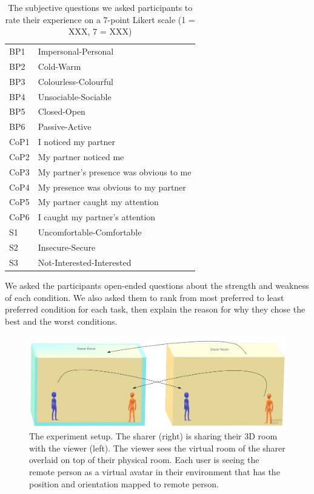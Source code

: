 \begin{table}
    \centering
    \begin{tabular}{ll}
BP1 &    Impersonal-Personal\\
BP2 &    Cold-Warm\\
BP3 &    Colourless-Colourful\\
BP4 &    Unsociable-Sociable\\
BP5 &    Closed-Open\\
BP6 &    Passive-Active\\
CoP1    &   I noticed my partner\\
CoP2    &   My partner noticed me\\
CoP3    &   My partner's presence was obvious to me\\
CoP4    &   My presence was obvious to my partner\\
CoP5    &   My partner caught my attention \\
CoP6    &   I caught my partner's attention\\
S1  & Uncomfortable-Comfortable\\
S2  & Insecure-Secure\\
S3  & Not-Interested-Interested\\
    \end{tabular}
    \caption{The subjective questions we asked participants to rate their experience on a 7-point Likert scale (1 = XXX, 7 = XXX)}
    \label{tab:frontier18:questions}
\end{table}

We asked the participants open-ended questions about the strength and weakness of each condition. We also asked them to rank from most preferred to least preferred condition for each task, then explain the reason for why they chose the best and the worst conditions. 

\begin{figure}
\begin{center}
\includegraphics[width=\linewidth]{images/frontier18/experiment-setup.jpg}
\caption{The experiment setup. The sharer (right) is sharing their 3D room with the viewer (left). The viewer sees the virtual room of the sharer overlaid on top of their physical room. Each user is seeing the remote person as a virtual avatar in their environment that has the position and orientation mapped to remote person.}\label{fig:frontier18:setup}
\end{center}
\end{figure}

